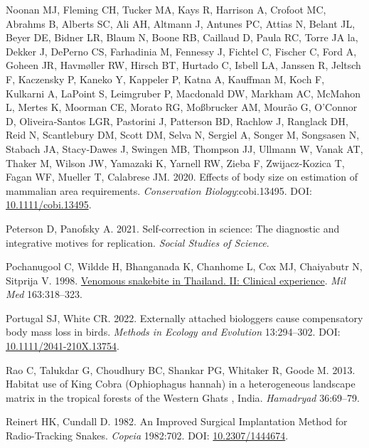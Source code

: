 \documentclass[10pt,a4paper]{article}
\newlength{\cslhangindent}
\newenvironment{CSLReferences}[2] %
 {\begin{list}{}{%
  \setlength{\itemindent}{0pt}
  \setlength{\leftmargin}{0pt}
  \setlength{\parsep}{0pt}
  \ifodd #1
   \setlength{\leftmargin}{\cslhangindent}
   \setlength{\itemindent}{-1\cslhangindent}
  \fi
  \setlength{\itemsep}{#2\baselineskip}}}
 {\end{list}}
\begin{document}
\begin{CSLReferences}{1}{0}
Noonan MJ, Fleming CH, Tucker MA, Kays R, Harrison A, Crofoot MC, Abrahms B, Alberts SC, Ali AH, Altmann J, Antunes PC, Attias N, Belant JL, Beyer DE, Bidner LR, Blaum N, Boone RB, Caillaud D, Paula RC, Torre JA la, Dekker J, DePerno CS, Farhadinia M, Fennessy J, Fichtel C, Fischer C, Ford A, Goheen JR, Havmøller RW, Hirsch BT, Hurtado C, Isbell LA, Janssen R, Jeltsch F, Kaczensky P, Kaneko Y, Kappeler P, Katna A, Kauffman M, Koch F, Kulkarni A, LaPoint S, Leimgruber P, Macdonald DW, Markham AC, McMahon L, Mertes K, Moorman CE, Morato RG, Moßbrucker AM, Mourão G, O'Connor D, Oliveira‐Santos LGR, Pastorini J, Patterson BD, Rachlow J, Ranglack DH, Reid N, Scantlebury DM, Scott DM, Selva N, Sergiel A, Songer M, Songsasen N, Stabach JA, Stacy‐Dawes J, Swingen MB, Thompson JJ, Ullmann W, Vanak AT, Thaker M, Wilson JW, Yamazaki K, Yarnell RW, Zieba F, Zwijacz‐Kozica T, Fagan WF, Mueller T, Calabrese JM. 2020. Effects of body size on estimation of mammalian area requirements. \emph{Conservation Biology}:cobi.13495. DOI: \href{https://doi.org/10.1111/cobi.13495}{10.1111/cobi.13495}.

Peterson D, Panofsky A. 2021. Self-correction in science: {The} diagnostic and integrative motives for replication. \emph{Social Studies of Science}.

Pochanugool C, Wildde H, Bhanganada K, Chanhome L, Cox MJ, Chaiyabutr N, Sitprija V. 1998. \href{https://www.ncbi.nlm.nih.gov/pubmed/9597849}{Venomous snakebite in {Thailand}. {II}: {Clinical} experience}. \emph{Mil Med} 163:318--323.

Portugal SJ, White CR. 2022. Externally attached biologgers cause compensatory body mass loss in birds. \emph{Methods in Ecology and Evolution} 13:294--302. DOI: \href{https://doi.org/10.1111/2041-210X.13754}{10.1111/2041-210X.13754}.

Rao C, Talukdar G, Choudhury BC, Shankar PG, Whitaker R, Goode M. 2013. Habitat use of {King} {Cobra} ({Ophiophagus} hannah) in a heterogeneous landscape matrix in the tropical forests of the {Western} {Ghats} , {India}. \emph{Hamadryad} 36:69--79.

Reinert HK, Cundall D. 1982. An {Improved} {Surgical} {Implantation} {Method} for {Radio}-{Tracking} {Snakes}. \emph{Copeia} 1982:702. DOI: \href{https://doi.org/10.2307/1444674}{10.2307/1444674}.


\end{CSLReferences}
\end{document}
